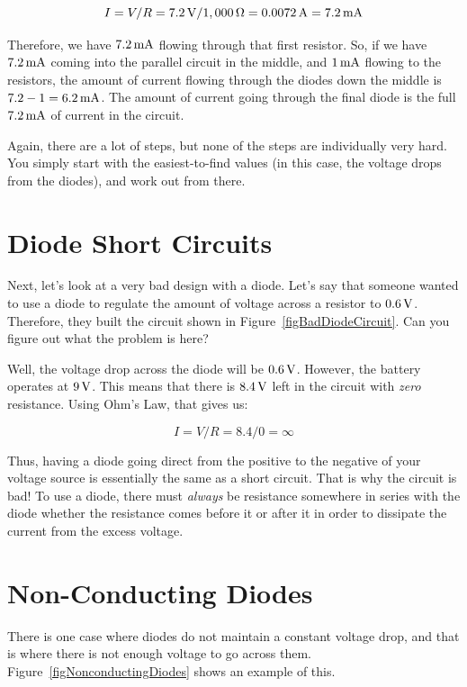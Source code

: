$$ I = V / R = 7.2\,\si{\volt} / 1,000\,\si{\ohm} = 0.0072\,\si{\ampere} = 7.2\,\si{\milli\ampere} $$

Therefore, we have $7.2\,\si{\milli\ampere}$ flowing through that first resistor.
So, if we have $7.2\,\si{\milli\ampere}$ coming into the parallel circuit in the middle, and $1\,\si{\milli\ampere}$ flowing to the resistors, the amount of current flowing through the diodes down the middle is $7.2 - 1 = 6.2\,\si{\milli\ampere}$.
The amount of current going through the final diode is the full $7.2\,\si{\milli\ampere}$ of current in the circuit.

Again, there are a lot of steps, but none of the steps are individually very hard.
You simply start with the easiest-to-find values (in this case, the voltage drops from the diodes), and work out from there.

\section{Diode Short Circuits}

Next, let's look at a very bad design with a diode.
Let's say that someone wanted to use a diode to regulate the amount of voltage across a resistor to $0.6\,\si{\volt}$.
Therefore, they built the circuit shown in Figure~\ref{figBadDiodeCircuit}.
Can you figure out what the problem is here?


Well, the voltage drop across the diode will be $0.6\,\si{\volt}$.
However, the battery operates at $9\,\si{\volt}$.  
This means that there is $8.4\,\si{\volt}$ left in the circuit with \emph{zero} resistance.
Using Ohm's Law, that gives us:

$$ I = V / R = 8.4 / 0 = \infty $$

Thus, having a diode going direct from the positive to the negative of your voltage source is essentially the same as a short circuit.  
That is why the circuit is bad!
To use a diode, there must \emph{always} be resistance somewhere in series with the diode whether the resistance comes before it or after it in order to dissipate the current from the excess voltage.

\section{Non-Conducting Diodes}

There is one case where diodes do not maintain a constant voltage drop, and that is where there is not enough voltage to go across them.
Figure~\ref{figNonconductingDiodes} shows an example of this.

